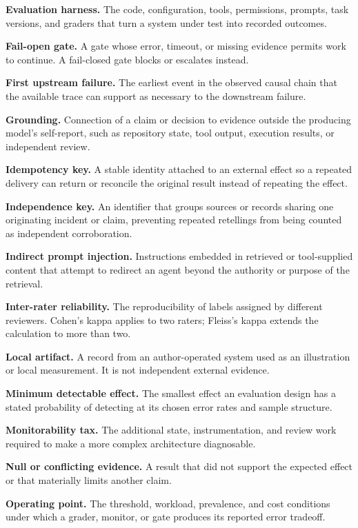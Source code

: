 \textbf{Evaluation harness.} The code, configuration, tools, permissions, prompts, task versions, and graders that turn a system under test into recorded outcomes.

\textbf{Fail-open gate.} A gate whose error, timeout, or missing evidence permits work to continue. A fail-closed gate blocks or escalates instead.

\textbf{First upstream failure.} The earliest event in the observed causal chain that the available trace can support as necessary to the downstream failure.

\textbf{Grounding.} Connection of a claim or decision to evidence outside the producing model's self-report, such as repository state, tool output, execution results, or independent review.

\textbf{Idempotency key.} A stable identity attached to an external effect so a repeated delivery can return or reconcile the original result instead of repeating the effect.

\textbf{Independence key.} An identifier that groups sources or records sharing one originating incident or claim, preventing repeated retellings from being counted as independent corroboration.

\textbf{Indirect prompt injection.} Instructions embedded in retrieved or tool-supplied content that attempt to redirect an agent beyond the authority or purpose of the retrieval.

\textbf{Inter-rater reliability.} The reproducibility of labels assigned by different reviewers. Cohen's kappa applies to two raters; Fleiss's kappa extends the calculation to more than two.

\textbf{Local artifact.} A record from an author-operated system used as an illustration or local measurement. It is not independent external evidence.

\textbf{Minimum detectable effect.} The smallest effect an evaluation design has a stated probability of detecting at its chosen error rates and sample structure.

\textbf{Monitorability tax.} The additional state, instrumentation, and review work required to make a more complex architecture diagnosable.

\textbf{Null or conflicting evidence.} A result that did not support the expected effect or that materially limits another claim.

\textbf{Operating point.} The threshold, workload, prevalence, and cost conditions under which a grader, monitor, or gate produces its reported error tradeoff.

